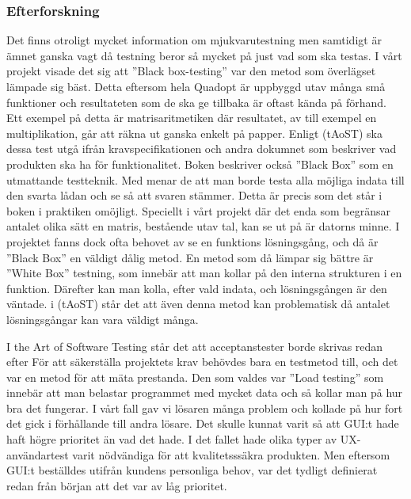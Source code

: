 	\subsubsection{Efterforskning}
	Det finns otroligt mycket information om mjukvarutestning men samtidigt är ämnet ganska vagt då testning beror så mycket på just vad som ska testas. I vårt projekt visade det sig att ''Black box-testing'' var den metod som överlägset lämpade sig bäst. Detta eftersom hela Quadopt är uppbyggd utav många små funktioner och resultateten som de ska ge tillbaka är oftast kända på förhand. Ett exempel på detta är matrisaritmetiken där resultatet, av till exempel en multiplikation, går att räkna ut ganska enkelt på papper. Enligt (tAoST) ska dessa test utgå ifrån kravspecifikationen och andra dokumnet som beskriver vad produkten ska ha för funktionalitet. Boken beskriver också ''Black Box'' som en utmattande testteknik. Med menar de att man borde testa alla möjliga indata till den svarta lådan och se så att svaren stämmer. Detta är precis som det står i boken i praktiken omöjligt. Speciellt i vårt projekt där det enda som begränsar antalet olika sätt en matris, bestående utav tal, kan se ut på är datorns minne. \newline
	I projektet fanns dock ofta behovet av se en funktions lösningsgång, och då är ''Black Box'' en väldigt dålig metod. En metod som då lämpar sig bättre är ''White Box'' testning, som innebär att man kollar på den interna strukturen i en funktion. Därefter kan man kolla, efter vald indata, och lösningsgången är den väntade. i (tAoST) står det att även denna metod kan problematisk då antalet lösningsgångar kan vara väldigt många.
 	
I the Art of Software Testing står det att acceptanstester borde skrivas redan efter
För att säkerställa projektets krav behövdes bara en testmetod till, och det var en metod för att mäta prestanda. Den som valdes var ''Load testing'' som innebär att man belastar programmet med mycket data och så kollar man på hur bra det fungerar. I vårt fall gav vi lösaren många problem och kollade på hur fort det gick i förhållande till andra lösare. \newline	
Det skulle kunnat varit så att GUI:t hade haft högre prioritet än vad det hade. I det fallet hade olika typer av UX- användartest varit nödvändiga för att kvalitetsssäkra produkten. Men eftersom GUI:t beställdes utifrån kundens personliga behov, var det tydligt definierat redan från början att det var av låg prioritet. 
	
